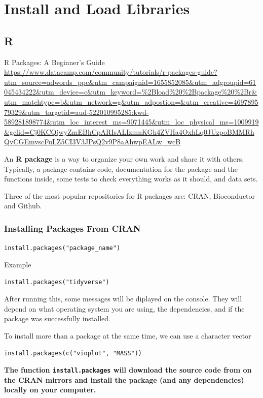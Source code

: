 \documentclass[]{book}
\begin{document}
\hypertarget{install-and-load-libraries}{%
\section{Install and Load Libraries}\label{install-and-load-libraries}}

\hypertarget{r-4}{%
\subsection{R}\label{r-4}}

R Packages: A Beginner's Guide \url{https://www.datacamp.com/community/tutorials/r-packages-guide?utm_source=adwords_ppc\&utm_campaignid=1655852085\&utm_adgroupid=61045434222\&utm_device=c\&utm_keyword=\%2Bload\%20\%2Bpackage\%20\%2Br\&utm_matchtype=b\&utm_network=g\&utm_adpostion=\&utm_creative=469789579329\&utm_targetid=aud-522010995285:kwd-589281898774\&utm_loc_interest_ms=9071445\&utm_loc_physical_ms=1009919\&gclid=Cj0KCQjwyZmEBhCpARIsALIzmnKGh4ZVHa4OxhLq0JUzpoBMMRhQvCGEmvscFuLZ5CI3V3JPsQ2v9P8aAhwpEALw_wcB}

An \textbf{R package} is a way to organize your own work and share it with others. Typically, a package contains code, documentation for the package and the functions inside, some tests to check everything works as it should, and data sets.

Three of the most popular repositories for R packages are: CRAN, Bioconductor and Github.

\hypertarget{installing-packages-from-cran}{%
\subsubsection{Installing Packages From CRAN}\label{installing-packages-from-cran}}

\texttt{install.packages("package\_name")}

Example

\texttt{install.packages("tidyverse")}

After running this, some messages will be diplayed on the console. They will depend on what operating system you are using, the dependencies, and if the package was successfully installed.

To install more than a package at the same time, we can use a character vector

\texttt{install.packages(c("vioplot",\ "MASS"))}

\textbf{The function \texttt{install.packages} will download the source code from on the CRAN mirrors and install the package (and any dependencies) locally on your computer.}
\end{document}
